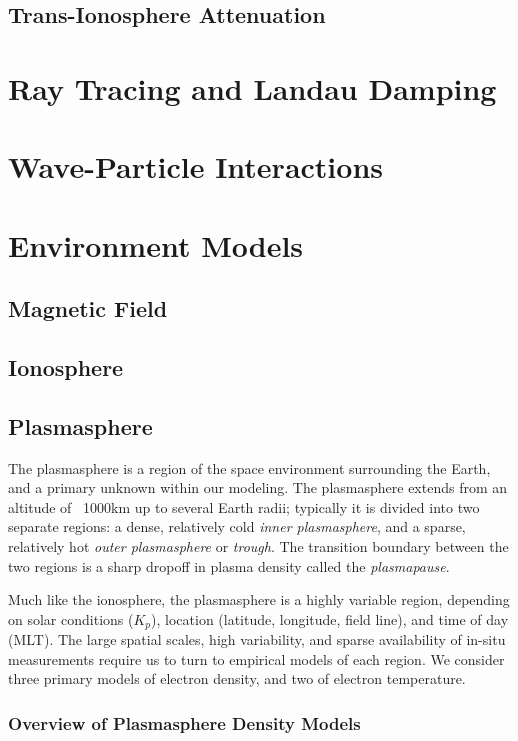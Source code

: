\subsection{Trans-Ionosphere Attenuation}

\section{Ray Tracing and Landau Damping}
\section{Wave-Particle Interactions}
\section{Environment Models}
\subsection{Magnetic Field}
\subsection{Ionosphere}
\subsection{Plasmasphere}
The plasmasphere is a region of the space environment surrounding the Earth, and a primary unknown within our modeling. The plasmasphere extends from an altitude of ~1000km up to several Earth radii; typically it is divided into two separate regions: a dense, relatively cold \emph{inner plasmasphere}, and a sparse, relatively hot \emph{outer plasmasphere} or \emph{trough}. The transition boundary between the two regions is a sharp dropoff in plasma density called the \emph{plasmapause}.

Much like the ionosphere, the plasmasphere is a highly variable region, depending on solar conditions ($K_p$), location (latitude, longitude, field line), and time of day (MLT). The large spatial scales, high variability, and sparse availability of in-situ measurements require us to turn to empirical models of each region. We consider three primary models of electron density, and two of electron temperature.

\subsubsection{Overview of Plasmasphere Density Models}

